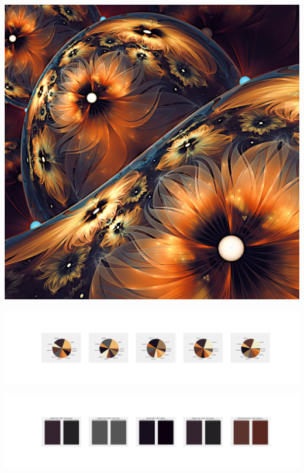 \documentclass[11pt]{article}
\begin{document}
\begin{landscape}
    \begin{center}
    \includegraphics[width=\textwidth]{./nbimg/file (445).jpg}
    \end{center}

    \begin{center}
    \includegraphics[width=250mm]{./nbimg/pie-384.jpg}
    \end{center}

    \begin{center}
    \includegraphics[width=250mm]{./nbimg/peak-384.jpg}
    \end{center}
    


\end{landscape}
\end{document}
